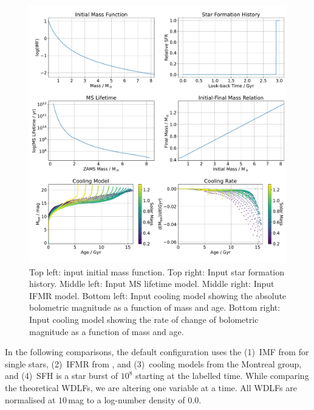 \documentclass[fleqn,usenatbib]{rasti}
\begin{document}
\begin{figure}
    \centering
    \includegraphics[width=\textwidth]{input_model.pdf}
    \caption{Top left: input initial mass function. Top right: Input star
    formation history. Middle left: Input MS lifetime model. Middle right:
    Input IFMR model. Bottom left: Input cooling model showing the absolute
    bolometric magnitude as a function of mass and age. Bottom right: Input
    cooling model showing the rate of change of bolometric magnitude as a
    function of mass and age.}
    \label{fig:input_model}
\end{figure}

In the following comparisons, the default configuration uses the (1)~IMF
from \citet{2003PASP..115..763C} for single stars, (2)~IFMR from
\citet{2008MNRAS.387.1693C}, and (3)~cooling models from the Montreal group,
and (4)~SFH is a star burst of $10^8$ starting at the labelled time.
While comparing the theoretical WDLFs, we are altering one variable at a time.
All WDLFs are normalised at $10$\,mag to a log-number density of $0.0$.
\end{document}
